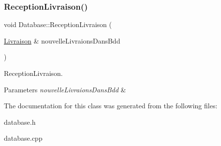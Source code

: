 \subsubsection{\texorpdfstring{Reception\+Livraison()}{ReceptionLivraison()}}
{\footnotesize\ttfamily void Database\+::\+Reception\+Livraison (\begin{DoxyParamCaption}\item[{\mbox{\hyperlink{class_livraison}{Livraison}} \&}]{nouvelle\+Livraions\+Dans\+Bdd }\end{DoxyParamCaption})}



Reception\+Livraison. 


\begin{DoxyParams}{Parameters}
{\em nouvelle\+Livraions\+Dans\+Bdd} & \\
\hline
\end{DoxyParams}


The documentation for this class was generated from the following files\+:\begin{DoxyCompactItemize}
\item 
database.\+h\item 
database.\+cpp\end{DoxyCompactItemize}
